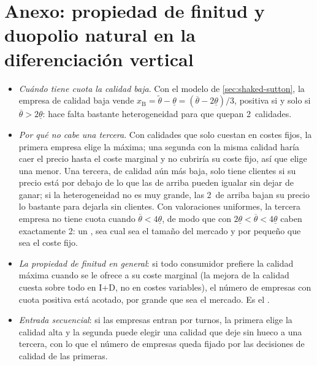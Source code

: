 \documentclass[11pt]{article}
\begin{document}
\section{Anexo: propiedad de finitud y duopolio natural\cortetitulo{} en la diferenciación vertical}\label{anexo:finitud}

\begin{itemize}
\item \emph{Cuándo tiene cuota la calidad baja}. Con el modelo de \ref{sec:shaked-sutton}, la empresa de calidad baja vende $x_{\mathrm{B}}=\tilde{\theta}-\underline{\theta}=(\overline{\theta}-2\underline{\theta})/3$, positiva si y solo si $\overline{\theta}>2\underline{\theta}$: hace falta bastante heterogeneidad para que quepan 2~calidades.
\item \emph{Por qué no cabe una tercera}. Con calidades que solo cuestan en costes fijos, la primera empresa elige la máxima; una segunda con la misma calidad haría caer el precio hasta el coste marginal y no cubriría su coste fijo, así que elige una menor. Una tercera, de calidad aún más baja, solo tiene clientes si su precio está por debajo de lo que las de arriba pueden igualar sin dejar de ganar; si la heterogeneidad no es muy grande, las 2~de arriba bajan su precio lo bastante para dejarla sin clientes. Con valoraciones uniformes, la tercera empresa no tiene cuota cuando $\overline{\theta}<4\underline{\theta}$, de modo que con $2\underline{\theta}<\overline{\theta}<4\underline{\theta}$ caben exactamente 2: un , sea cual sea el tamaño del mercado y por pequeño que sea el coste fijo\nocite{ShakedSutton1982Relaxing}.
\item \emph{La propiedad de finitud en general}: si todo consumidor prefiere la calidad máxima cuando se le ofrece a su coste marginal (la mejora de la calidad cuesta sobre todo en I+D, no en costes variables), el número de empresas con cuota positiva está acotado, por grande que sea el mercado\nocite{ShakedSutton1983Natural}. Es el .
\item \emph{Entrada secuencial}: si las empresas entran por turnos, la primera elige la calidad alta y la segunda puede elegir una calidad que deje sin hueco a una tercera, con lo que el número de empresas queda fijado por las decisiones de calidad de las primeras.
\end{itemize}

\end{document}
